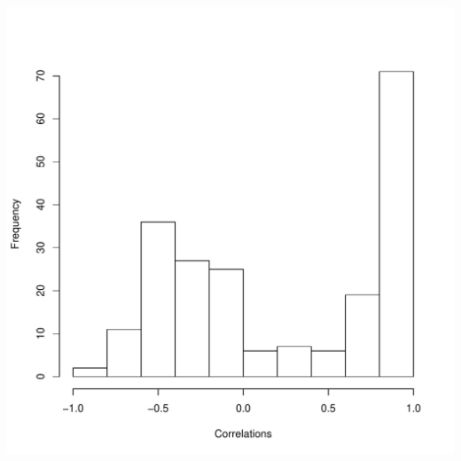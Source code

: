 \documentclass[12pt]{article}
\begin{document}
\centerline{\includegraphics{correlation.pdf}}
\end{document}
